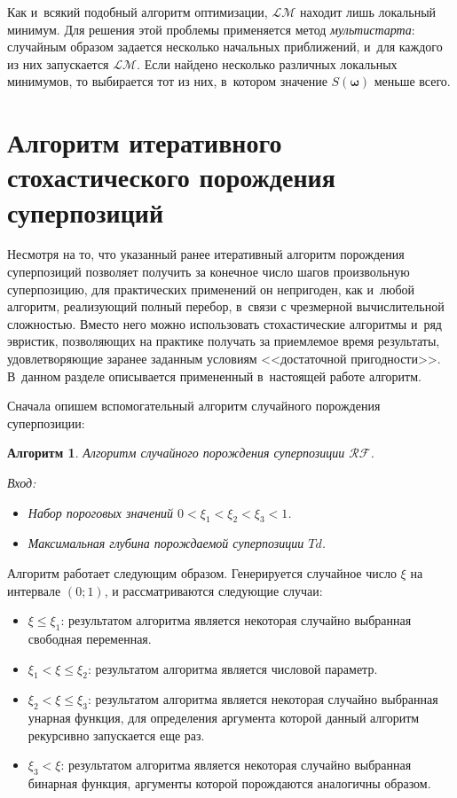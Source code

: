 \documentclass[12pt,a4paper]{article}
\newtheorem{algo}{Алгоритм}
\begin{document}
Как и~всякий подобный алгоритм оптимизации, $\mathcal{LM}$ находит лишь
локальный минимум. Для решения этой проблемы применяется метод \emph{мультистарта}:
случайным образом задается несколько начальных приближений, и~для каждого из
них запускается $\mathcal{LM}$. Если найдено несколько различных локальных
минимумов, то выбирается тот из них, в~котором значение $S(\boldsymbol{\omega})$
меньше всего.

\section{Алгоритм итеративного стохастического порождения суперпозиций}

Несмотря на то, что указанный ранее итеративный алгоритм порождения
суперпозиций позволяет получить за конечное число шагов произвольную
суперпозицию, для практических применений он непригоден, как и~любой алгоритм,
реализующий полный перебор, в~связи с чрезмерной вычислительной сложностью.
Вместо него можно использовать стохастические алгоритмы и~ряд эвристик,
позволяющих на практике получать за приемлемое время результаты,
удовлетворяющие заранее заданным условиям <<достаточной пригодности>>.
В~данном разделе описывается примененный в~настоящей работе алгоритм.

Сначала опишем вспомогательный алгоритм случайного порождения суперпозиции:

\begin{algo}
  \label{algo:RF}
  Алгоритм случайного порождения суперпозиции $\mathcal{RF}$.

  Вход:
  \begin{itemize}
	\item Набор пороговых значений $0 < \xi_1 < \xi_2 < \xi_3 < 1$.
	\item Максимальная глубина порождаемой суперпозиции $Td$.
  \end{itemize}
\end{algo}

Алгоритм работает следующим образом. Генерируется случайное число $\xi$ на
интервале $(0; 1)$, и рассматриваются следующие случаи:
\begin{itemize}
  \item $\xi \leq \xi_1$: результатом алгоритма является некоторая случайно
	выбранная свободная переменная.
  \item $\xi_1 < \xi \leq \xi_2$: результатом алгоритма является	числовой
	параметр.
  \item $\xi_2 < \xi \leq \xi_3$: результатом алгоритма является некоторая
	случайно выбранная унарная функция, для определения аргумента которой
	данный алгоритм рекурсивно запускается еще раз.
  \item $\xi_3 < \xi$: результатом алгоритма является некоторая случайно
	выбранная бинарная функция, аргументы которой порождаются аналогичны
	образом.
\end{itemize}
\end{document}
